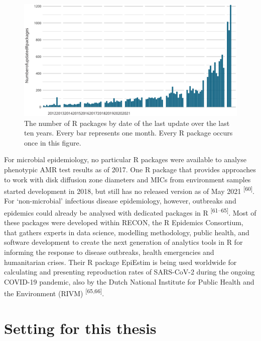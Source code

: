 \documentclass[
]{book}
\begin{document}
\begin{figure}

{\centering \includegraphics[width=1\linewidth]{images/01-04} 

}

\caption{The number of R packages by date of the last update over the last ten years. Every bar represents one month. Every R package occurs once in this figure.}\label{fig:fig1-4}
\end{figure}

For microbial epidemiology, no particular R packages were available to analyse phenotypic AMR test results as of 2017. One R package that provides approaches to work with disk diffusion zone diameters and MICs from environment samples started development in 2018, but still has no released version as of May 2021 \textsuperscript{{[}60{]}}. For `non-microbial' infectious disease epidemiology, however, outbreaks and epidemics could already be analysed with dedicated packages in R \textsuperscript{{[}61--65{]}}. Most of these packages were developed within RECON, the R Epidemics Consortium, that gathers experts in data science, modelling methodology, public health, and software development to create the next generation of analytics tools in R for informing the response to disease outbreaks, health emergencies and humanitarian crises. Their R package EpiEstim is being used worldwide for calculating and presenting reproduction rates of SARS-CoV-2 during the ongoing COVID-19 pandemic, also by the Dutch National Institute for Public Health and the Environment (RIVM) \textsuperscript{{[}65,66{]}}.

\hypertarget{setting-for-this-thesis}{%
\section{Setting for this thesis}\label{setting-for-this-thesis}}
\end{document}
